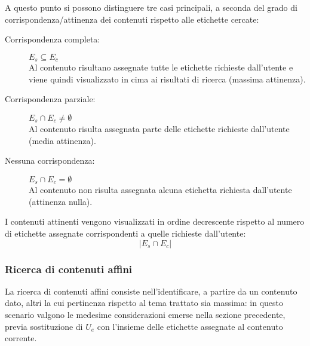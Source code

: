\documentclass[10pt,a4paper,headinclude,footinclude,hidelinks]{scrreprt} %
\begin{document}
	A questo punto si possono distinguere tre casi principali, a seconda del grado di corrispondenza/attinenza dei contenuti rispetto alle etichette cercate:
	\begin{description}
	\item[Corrispondenza completa:] $E_s \subseteq E_c$ \hfill \\
	Al contenuto risultano assegnate tutte le etichette richieste dall'utente e viene quindi visualizzato in cima ai risultati di ricerca (massima attinenza).
 	\item[Corrispondenza parziale:] $E_s \cap E_c \neq \emptyset$ \hfill \\
	Al contenuto risulta assegnata parte delle etichette richieste dall'utente (media attinenza).
	\item[Nessuna corrispondenza:] $E_s \cap E_c = \emptyset$\hfill \\
	Al contenuto non risulta assegnata alcuna etichetta richiesta dall'utente (attinenza nulla).
	\end{description}

	I contenuti attinenti vengono visualizzati in ordine decrescente rispetto al numero di etichette assegnate corrispondenti a quelle richieste dall'utente:
	$$\left|{E_s \cap E_c}\right|$$

	\subsubsection{Ricerca di contenuti affini}
	La ricerca di contenuti affini consiste nell'identificare, a partire da un contenuto dato, altri la cui pertinenza rispetto al tema trattato sia massima: in questo scenario valgono le medesime considerazioni emerse nella sezione precedente, previa sostituzione di $U_e$ con l'insieme delle etichette assegnate al contenuto corrente.

\end{document}
